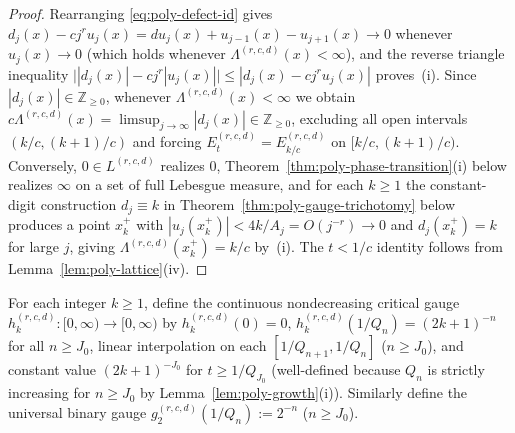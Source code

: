 \documentclass[11pt]{article}
\theoremstyle{definition}
\theoremstyle{remark}
\newcommand{\Z}{\mathbb{Z}}
\newcommand{\Lam}{\Lambda}
\begin{document}
\begin{proof}
Rearranging \eqref{eq:poly-defect-id} gives
$d_j(x)-cj^ru_j(x)=du_j(x)+u_{j-1}(x)-u_{j+1}(x)\to0$ whenever $u_j(x)\to0$
(which holds whenever $\Lam^{(r,c,d)}(x)<\infty$), and the reverse triangle
inequality $\bigl||d_j(x)|-cj^r|u_j(x)|\bigr|\le|d_j(x)-cj^ru_j(x)|$ proves~(i).
Since $|d_j(x)|\in\Z_{\ge0}$, whenever $\Lam^{(r,c,d)}(x)<\infty$ we obtain
$c\Lam^{(r,c,d)}(x)=\limsup_{j\to\infty}|d_j(x)|\in\Z_{\ge0}$, excluding all
open intervals $(k/c,(k+1)/c)$ and forcing $E_t^{(r,c,d)}=E_{k/c}^{(r,c,d)}$ on
$[k/c,(k+1)/c)$. Conversely, $0\in L^{(r,c,d)}$ realizes $0$,
Theorem~\ref{thm:poly-phase-transition}(i) below realizes $\infty$ on a set of
full Lebesgue measure, and for each $k\ge1$ the constant-digit construction
$d_j\equiv k$ in Theorem~\ref{thm:poly-gauge-trichotomy} below produces a point
$x_k^+$ with $|u_j(x_k^+)|<4k/A_j=O(j^{-r})\to0$ and $d_j(x_k^+)=k$ for large
$j$, giving $\Lam^{(r,c,d)}(x_k^+)=k/c$ by~(i). The $t<1/c$ identity follows from
Lemma~\ref{lem:poly-lattice}(iv).
\end{proof}

For each integer $k\ge1$, define the continuous nondecreasing critical gauge
$h_k^{(r,c,d)}:[0,\infty)\to[0,\infty)$ by $h_k^{(r,c,d)}(0)=0$,
$h_k^{(r,c,d)}(1/Q_n)=(2k+1)^{-n}$ for all $n\ge J_0$, linear interpolation on
each $[1/Q_{n+1},1/Q_n]$ ($n\ge J_0$), and constant value $(2k+1)^{-J_0}$ for
$t\ge1/Q_{J_0}$ (well-defined because $Q_n$ is strictly increasing for
$n\ge J_0$ by Lemma~\ref{lem:poly-growth}(i)). Similarly define the universal
binary gauge $g_2^{(r,c,d)}(1/Q_n):=2^{-n}$ ($n\ge J_0$).
\end{document}

